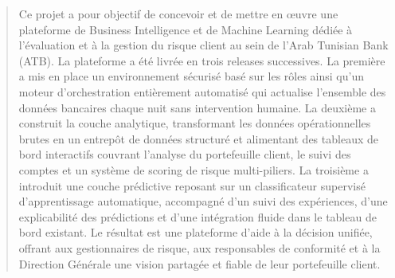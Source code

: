 \begin{abstract}
Ce projet a pour objectif de concevoir et de mettre en œuvre une plateforme de Business Intelligence et de Machine Learning dédiée à l'évaluation et à la gestion du risque client au sein de l'Arab Tunisian Bank (ATB). La plateforme a été livrée en trois releases successives. La première a mis en place un environnement sécurisé basé sur les rôles ainsi qu'un moteur d'orchestration entièrement automatisé qui actualise l'ensemble des données bancaires chaque nuit sans intervention humaine. La deuxième a construit la couche analytique, transformant les données opérationnelles brutes en un entrepôt de données structuré et alimentant des tableaux de bord interactifs couvrant l'analyse du portefeuille client, le suivi des comptes et un système de scoring de risque multi-piliers. La troisième a introduit une couche prédictive reposant sur un classificateur supervisé d'apprentissage automatique, accompagné d'un suivi des expériences, d'une explicabilité des prédictions et d'une intégration fluide dans le tableau de bord existant. Le résultat est une plateforme d'aide à la décision unifiée, offrant aux gestionnaires de risque, aux responsables de conformité et à la Direction Générale une vision partagée et fiable de leur portefeuille client. \\


\end{abstract}
